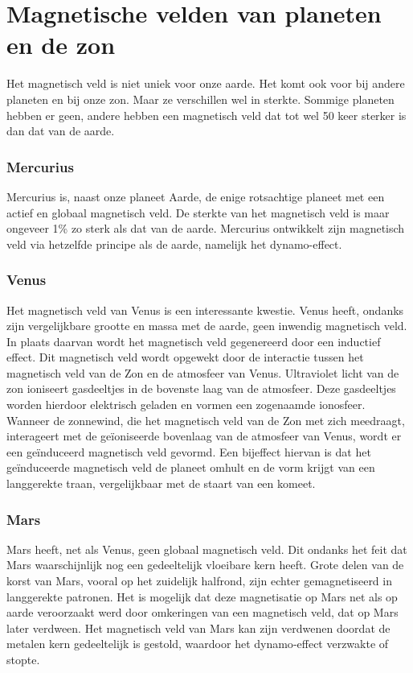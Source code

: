\documentclass[12pt,a4paper]{article}
\begin{document}
\clearpage
\section{Magnetische velden van planeten en de zon}
Het magnetisch veld is niet uniek voor onze aarde. Het komt ook voor bij andere planeten en bij onze zon. Maar ze verschillen wel in sterkte.
Sommige planeten hebben er geen, andere hebben een magnetisch veld dat tot wel 50 keer sterker is dan dat van de aarde.

\subsubsection*{Mercurius}
Mercurius is, naast onze planeet Aarde, de enige rotsachtige planeet met een actief en globaal magnetisch veld.
De sterkte van het magnetisch veld is maar ongeveer 1\% zo sterk als dat van de aarde.
Mercurius ontwikkelt zijn magnetisch veld via hetzelfde principe als de aarde, namelijk het dynamo-effect. \cite{olaf_1}

\subsubsection*{Venus}
Het magnetisch veld van Venus is een interessante kwestie. Venus heeft, ondanks zijn vergelijkbare grootte en massa met de aarde, geen inwendig magnetisch veld.
In plaats daarvan wordt het magnetisch veld gegenereerd door een inductief effect.
Dit magnetisch veld wordt opgewekt door de interactie tussen het magnetisch veld van de Zon en de atmosfeer van Venus. Ultraviolet licht van de zon ioniseert gasdeeltjes in de bovenste laag van de atmosfeer.
Deze gasdeeltjes worden hierdoor elektrisch geladen en vormen een zogenaamde ionosfeer.
Wanneer de zonnewind, die het magnetisch veld van de Zon met zich meedraagt, interageert met de geïoniseerde bovenlaag van de atmosfeer van Venus, wordt er een geïnduceerd magnetisch veld gevormd.
Een bijeffect hiervan is dat het geïnduceerde magnetisch veld de planeet omhult en de vorm krijgt van een langgerekte traan, vergelijkbaar met de staart van een komeet. \cite{olaf_3}

\subsubsection*{Mars}
Mars heeft, net als Venus, geen globaal magnetisch veld. Dit ondanks het feit dat Mars waarschijnlijk nog een gedeeltelijk vloeibare kern heeft.
Grote delen van de korst van Mars, vooral op het zuidelijk halfrond, zijn echter gemagnetiseerd in langgerekte patronen. Het is mogelijk dat deze magnetisatie op Mars net als op aarde veroorzaakt werd door omkeringen van een magnetisch veld, dat op Mars later verdween.
Het magnetisch veld van Mars kan zijn verdwenen doordat de metalen kern gedeeltelijk is gestold, waardoor het dynamo‑effect verzwakte of stopte. \cite{olaf_4} 
\end{document}
